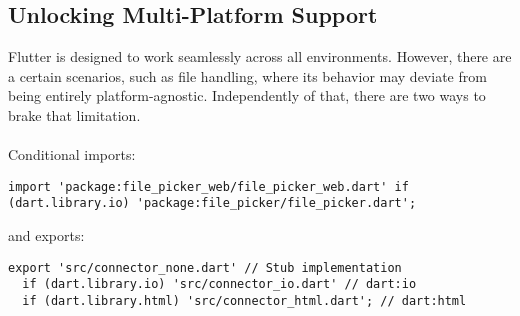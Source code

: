 
\subsection{Unlocking Multi-Platform Support}

Flutter is designed to work seamlessly across all environments. However, there are a certain scenarios, such as file
handling, where its behavior may deviate from being entirely platform-agnostic. Independently of that, there are two
ways to brake that limitation.\\
\\

\noindent Conditional imports:

\begin{lstlisting}
import 'package:file_picker_web/file_picker_web.dart' if (dart.library.io) 'package:file_picker/file_picker.dart';
\end{lstlisting}

\noindent and exports:

\begin{lstlisting}
export 'src/connector_none.dart' // Stub implementation
  if (dart.library.io) 'src/connector_io.dart' // dart:io
  if (dart.library.html) 'src/connector_html.dart'; // dart:html
\end{lstlisting}
